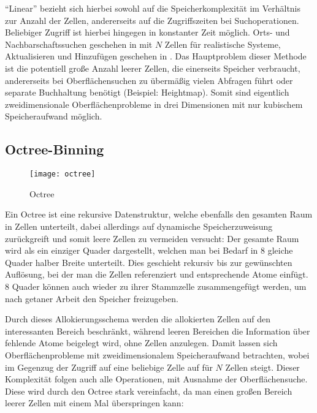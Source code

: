 ``Linear'' bezieht sich hierbei sowohl auf die Speicherkomplexität im Verhältnis zur Anzahl der Zellen, andererseits auf die Zugriffszeiten bei Suchoperationen. Beliebiger Zugriff ist hierbei hingegen in konstanter Zeit möglich.
Orts- und Nachbarschaftssuchen geschehen in  mit $N$ Zellen für realistische Systeme, Aktualisieren und Hinzufügen geschehen in .
Das Hauptproblem dieser Methode ist die potentiell große Anzahl leerer Zellen, die einerseits Speicher verbraucht, andererseits bei Oberflächensuchen zu übermäßig vielen Abfragen führt oder separate Buchhaltung benötigt (Beispiel: Heightmap).
Somit sind eigentlich zweidimensionale Oberflächenprobleme in drei Dimensionen mit nur kubischem Speicheraufwand möglich.

\subsection{Octree-Binning}

\begin{figure}[tbhp]
  \centering
  \texttt{[image: octree]}
  \caption[Octree]{Octree}
  \label{fig:octree}
\end{figure}

Ein Octree ist eine rekursive Datenstruktur, welche ebenfalls den gesamten Raum in Zellen unterteilt, dabei allerdings auf dynamische Speicherzuweisung zurückgreift und somit leere Zellen zu vermeiden versucht:
Der gesamte Raum wird als ein einziger Quader dargestellt, welchen man bei Bedarf in 8 gleiche Quader halber Breite unterteilt.
Dies geschieht rekursiv bis zur gewünschten Auflösung, bei der man die Zellen referenziert und entsprechende Atome einfügt.
8 Quader können auch wieder zu ihrer Stammzelle zusammengefügt werden, um nach getaner Arbeit den Speicher freizugeben.

Durch dieses Allokierungsschema werden die allokierten Zellen auf den interessanten Bereich beschränkt, während leeren Bereichen die Information über fehlende Atome beigelegt wird, ohne Zellen anzulegen.
Damit lassen sich Oberflächenprobleme mit zweidimensionalem Speicheraufwand betrachten, wobei im Gegenzug der Zugriff auf eine beliebige Zelle auf  für $N$ Zellen steigt.
Dieser Komplexität folgen auch alle Operationen, mit Ausnahme der Oberflächensuche.
Diese wird durch den Octree stark vereinfacht, da man einen großen Bereich leerer Zellen mit einem Mal überspringen kann:

